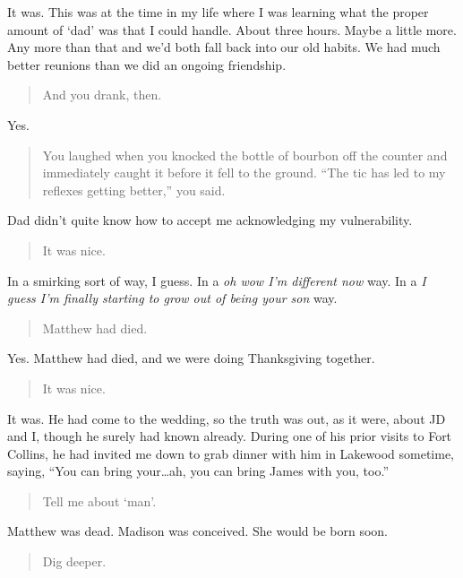 It was. This was at the time in my life where I was learning what the proper amount of `dad' was that I could handle. About three hours. Maybe a little more. Any more than that and we'd both fall back into our old habits. We had much better reunions than we did an ongoing friendship.

\begin{quote}
And you drank, then.
\end{quote}

Yes.

\begin{quote}
You laughed when you knocked the bottle of bourbon off the counter and immediately caught it before it fell to the ground. ``The tic has led to my reflexes getting better,'' you said.
\end{quote}

Dad didn't quite know how to accept me acknowledging my vulnerability.

\begin{quote}
It was nice.
\end{quote}

In a smirking sort of way, I guess. In a \emph{oh wow I'm different now} way. In a \emph{I guess I'm finally starting to grow out of being your son} way.

\begin{quote}
Matthew had died.
\end{quote}

Yes. Matthew had died, and we were doing Thanksgiving together.

\begin{quote}
It was nice.
\end{quote}

It was. He had come to the wedding, so the truth was out, as it were, about JD and I, though he surely had known already. During one of his prior visits to Fort Collins, he had invited me down to grab dinner with him in Lakewood sometime, saying, ``You can bring your\ldots{}ah, you can bring James with you, too.''

\begin{quote}
Tell me about `man'.
\end{quote}

Matthew was dead. Madison was conceived. She would be born soon.

\begin{quote}
Dig deeper.
\end{quote}
